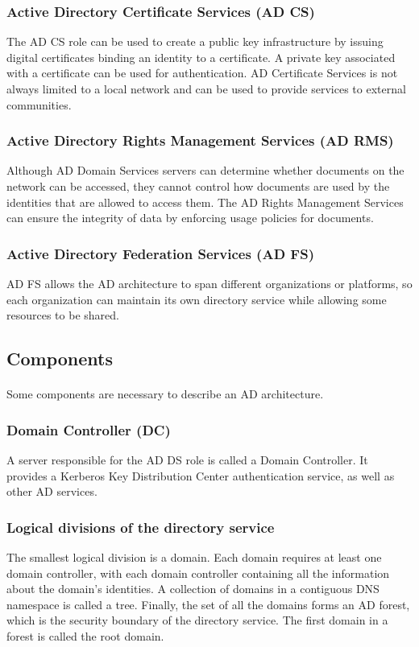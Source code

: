 \subsubsection{Active Directory Certificate Services (AD CS)}
The AD CS role can be used to create a public key infrastructure by issuing digital certificates binding an identity to a certificate. A private key associated with a certificate can be used for authentication. AD Certificate Services is not always limited to a local network and can be used to provide services to external communities.

\subsubsection{Active Directory Rights Management Services (AD RMS)}
Although AD Domain Services servers can determine whether documents on the network can be accessed, they cannot control how documents are used by the identities that are allowed to access them. The AD Rights Management Services can ensure the integrity of data by enforcing usage policies for documents.

\subsubsection{Active Directory Federation Services (AD FS)}
AD FS allows the AD architecture to span different organizations or platforms, so each organization can maintain its own directory service while allowing some resources to be shared.


\subsection{Components}
\paragraph{}
Some components are necessary to describe an AD architecture.

\subsubsection{Domain Controller (DC)}
A server responsible for the AD DS role is called a Domain Controller. It provides a Kerberos Key Distribution Center authentication service, as well as other AD services\cite[p. 9]{holme_self-paced_2011}.


\subsubsection{Logical divisions of the directory service}
The smallest logical division is a domain. Each domain requires at least one domain controller, with each domain controller containing all the information about the domain's identities. A collection of domains in a contiguous DNS namespace is called a tree. Finally, the set of all the domains forms an AD forest, which is the security boundary of the directory service. The first domain in a forest is called the root domain\cite[p. 9]{holme_self-paced_2011}.

